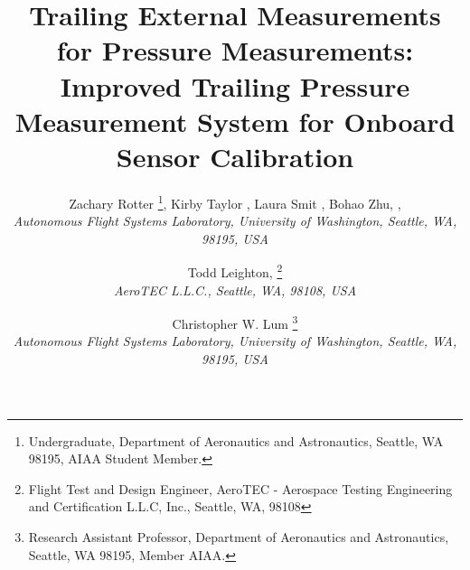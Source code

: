\documentclass[]{aiaa-tc}%
\title{Trailing External Measurements for Pressure Measurements: Improved Trailing Pressure Measurement System for Onboard Sensor Calibration }
\author{
%
Zachary Rotter
  \thanks{Undergraduate, Department of Aeronautics and Astronautics, Seattle, WA 98195, AIAA Student Member.},
  Kirby Taylor%
    \thanksibid{1},
    Laura Smit%
    \thanksibid{1},
  Bohao Zhu,%
  \thanksibid{1},
  \\
  {\normalsize\itshape
   Autonomous Flight Systems Laboratory, University of Washington, Seattle, WA, 98195, USA}\\
  \and
  Todd Leighton,%
   \thanks{Flight Test and Design Engineer, AeroTEC - Aerospace Testing Engineering and Certification L.L.C, Inc., Seattle, WA, 98108}\\
  {\normalsize\itshape
  AeroTEC L.L.C., Seattle, WA, 98108, USA}\\
  \and
  Christopher W. Lum%
   \thanks{Research Assistant Professor, Department of Aeronautics and Astronautics, Seattle, WA 98195, Member AIAA.}\\
  {\normalsize\itshape
  Autonomous Flight Systems Laboratory, University of Washington, Seattle, WA, 98195, USA}
 }
\begin{document}
\maketitle

\begin{abstract}
	
\end{abstract}













%

\raggedright %
\sloppy %


\end{document}
